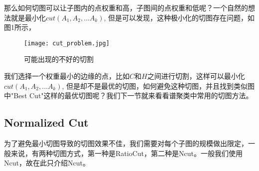 那么如何切图可以让子图内的点权重和高，子图间的点权重和低呢？一个自然的想法就是最小化$cut(A_1,A_2,...A_k)$, 但是可以发现，这种极小化的切图存在问题，如图1所示，
\begin{figure}[h]
    \centering
    \texttt{[image: cut\_problem.jpg]}
    \caption{可能出现的不好的切割}
\end{figure}
我们选择一个权重最小的边缘的点，比如$C$和$H$之间进行切割，这样可以最小化$cut(A_1,A_2,...A_k)$, 但是却不是最优的切图，如何避免这种切图，并且找到类似图中"Best Cut"这样的最优切图呢？我们下一节就来看看谱聚类中常用的切图方法。

\subsection{Normalized Cut}
为了避免最小切图导致的切图效果不佳，我们需要对每个子图的规模做出限定，一般来说，有两种切图方式，第一种是RatioCut，第二种是Ncut。一般我们使用Ncut，故在此只介绍Ncut。

